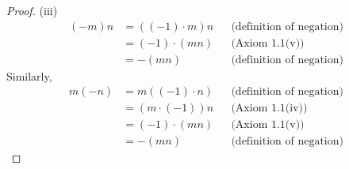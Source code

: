 \begin{proof}
    (iii)
    \begin{align*}
        (-m)n & = ((-1) \cdot m)n &  & \text{(definition of negation)} \\
              & = (-1) \cdot (mn) &  & \text{(Axiom 1.1(v))}           \\
              & = -(mn)           &  & \text{(definition of negation)}
    \end{align*}
    Similarly,
    \begin{align*}
        m(-n) & = m((-1) \cdot n) &  & \text{(definition of negation)} \\
              & = (m \cdot (-1))n &  & \text{(Axiom 1.1(iv))}          \\
              & = (-1) \cdot (mn) &  & \text{(Axiom 1.1(v))}           \\
              & = -(mn)           &  & \text{(definition of negation)}
    \end{align*}
\end{proof}


